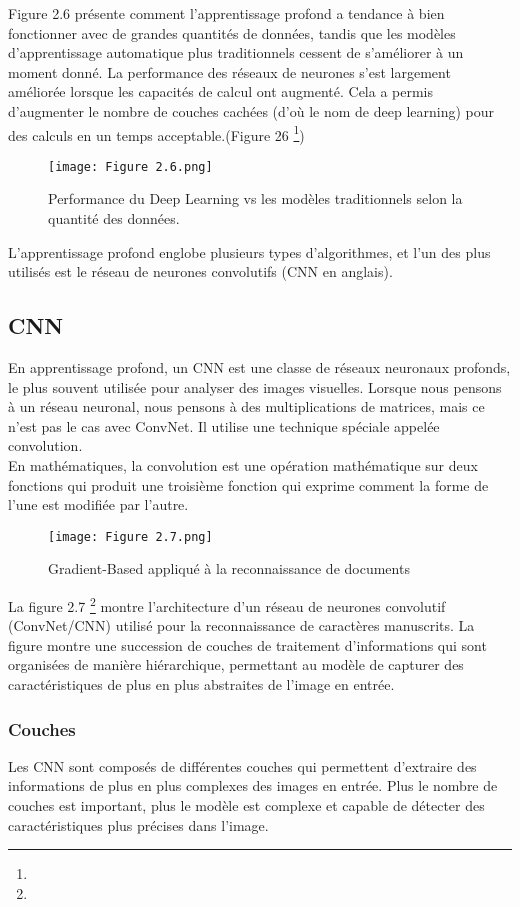 Figure 2.6 présente comment l’apprentissage profond a tendance à bien fonctionner avec de grandes quantités de données, tandis que les modèles d’apprentissage automatique plus traditionnels cessent de s’améliorer à un moment donné.
\clearpage
La performance des réseaux de neurones s'est largement améliorée lorsque les capacités de calcul ont augmenté. Cela a permis d'augmenter le nombre de couches cachées (d'où le nom de deep learning) pour des calculs en un temps acceptable.(Figure 26 \footnote{})
\begin{figure}[!h]
  \centering
  \texttt{[image: Figure 2.6.png]}
  \caption{Performance du Deep Learning vs les modèles traditionnels selon la quantité des données.}
  \label{fig:Deep Learning vs les modèles traditionnels. }
\end{figure}
\newline
L'apprentissage profond englobe plusieurs types d'algorithmes, et l'un des plus utilisés est le réseau de neurones convolutifs (CNN en anglais).

\subsection{CNN}
En apprentissage profond, un CNN est une classe de réseaux neuronaux profonds, le plus souvent utilisée pour analyser des images visuelles.
 Lorsque nous pensons à un réseau neuronal, nous pensons à des multiplications de matrices, mais ce n'est pas le cas avec ConvNet. Il utilise une technique spéciale appelée convolution.\\En mathématiques, la convolution est une opération mathématique sur deux fonctions qui produit une troisième fonction qui exprime comment la forme de l'une est modifiée par l'autre.
 \begin{figure}[!h]
  \centering
  \texttt{[image: Figure 2.7.png]}
  \caption{Gradient-Based appliqué à la reconnaissance de documents}
  \label{fig:Gradient-Based appliqué à la reconnaissance de docuemnts. }
\end{figure}

La figure 2.7 \footnote{} montre l'architecture d'un réseau de neurones convolutif (ConvNet/CNN) utilisé pour la reconnaissance de caractères manuscrits.
La figure montre une succession de couches de traitement d'informations qui sont organisées de manière hiérarchique, permettant au modèle de capturer des caractéristiques de plus en plus abstraites de l'image en entrée.
\subsubsection{Couches}
Les CNN sont composés de différentes couches qui permettent d'extraire des informations de plus en plus complexes des images en entrée. Plus le nombre de couches est important, plus le modèle est complexe et capable de détecter des caractéristiques plus précises dans l'image.


